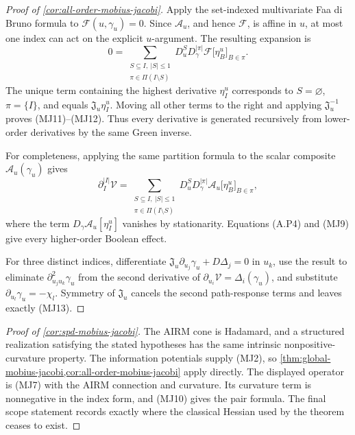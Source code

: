 \begin{proof}[Proof of \cref{cor:all-order-mobius-jacobi}]
Apply the set-indexed multivariate Faa di Bruno formula to
\(\mathscr F(u,\gamma_u)=0\).  Since \(\mathcal A_u\), and hence
\(\mathscr F\), is affine in \(u\), at most one index can act on the explicit
\(u\)-argument.  The resulting expansion is
\[
  0=\sum_{\substack{S\subseteq I,\ |S|\le1\\
  \pi\in\Pi(I\setminus S)}}
  D_u^S D_\gamma^{|\pi|}\mathscr F
  \bigl[\eta_B^u\bigr]_{B\in\pi}.
\]
The unique term containing the highest derivative \(\eta_I^u\) corresponds to
\(S=\varnothing\), \(\pi=\{I\}\), and equals
\(\mathfrak J_u\eta_I^u\).  Moving all other terms to the right and applying
\(\mathfrak J_u^{-1}\) proves (MJ11)--(MJ12).  Thus every derivative is
generated recursively from lower-order derivatives by the same Green inverse.

For completeness, applying the same partition formula to the scalar composite
\(\mathcal A_u(\gamma_u)\) gives
\begin{equation}
  \partial_I^{|I|}\mathcal V
  =\sum_{\substack{S\subseteq I,\ |S|\le1\\
  \pi\in\Pi(I\setminus S)}}
  D_u^S D_\gamma^{|\pi|}\mathcal A_u
  \bigl[\eta_B^u\bigr]_{B\in\pi},
  \tag{A.P4}
\end{equation}
where the term \(D_\gamma\mathcal A_u[\eta_I^u]\) vanishes by stationarity.
Equations (A.P4) and (MJ9) give every higher-order Boolean effect.

For three distinct indices, differentiate
\(\mathfrak J_u\partial_{u_j}\gamma_u+D\Delta_j=0\) in \(u_k\), use the
result to eliminate \(\partial_{u_j u_k}^2\gamma_u\) from the second derivative
of \(\partial_{u_i}\mathcal V=\Delta_i(\gamma_u)\), and substitute
\(\partial_{u_l}\gamma_u=-\chi_l\).  Symmetry of \(\mathfrak J_u\) cancels
the second path-response terms and leaves exactly (MJ13).
\end{proof}

\begin{proof}[Proof of \cref{cor:spd-mobius-jacobi}]
The AIRM cone is Hadamard, and a structured realization satisfying the stated
hypotheses has the same intrinsic nonpositive-curvature property.  The
information potentials supply (MJ2), so
\cref{thm:global-mobius-jacobi,cor:all-order-mobius-jacobi} apply directly.
The displayed operator is (MJ7) with the AIRM connection and curvature.  Its
curvature term is nonnegative in the index form, and (MJ10) gives the pair
formula.  The final scope statement records exactly where the classical
Hessian used by the theorem ceases to exist.
\end{proof}

